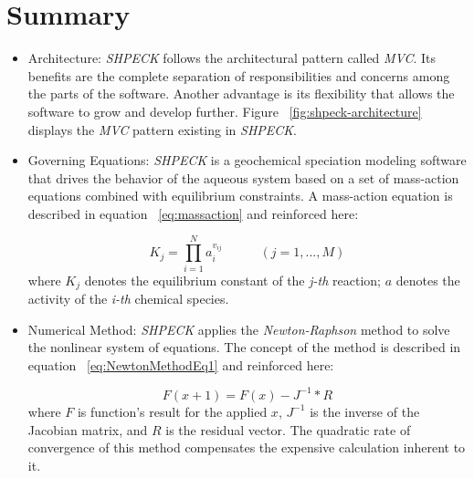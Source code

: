 \section{Summary}
\begin{itemize}
\item Architecture: \emph{SHPECK} follows the architectural pattern called \emph{MVC}. Its benefits are the complete separation of responsibilities and concerns among the parts of the software. Another advantage is its flexibility that allows the software to grow and develop further. Figure ~\ref{fig:shpeck-architecture} displays the \emph{MVC} pattern existing in \emph{SHPECK}.
\item Governing Equations: \emph{SHPECK} is a geochemical speciation modeling software that drives the behavior of the aqueous system based on a set of mass-action equations combined with equilibrium constraints. A mass-action equation is described in equation  ~\ref{eq:massaction} and reinforced here:

\begin{equation}
K_j =  \prod\limits_{i=1}^N  a_i^{v_{ij}} \hspace{35pt}    (j = 1, ... , M)
\end{equation}
where $K_j$ denotes the equilibrium constant of the \emph{j-th} reaction; $a$ denotes the activity of the \emph{i-th} chemical species.

\item Numerical Method: \emph{SHPECK} applies the \emph{Newton-Raphson} method to solve the nonlinear system of equations. The concept of the method is described in equation ~\ref{eq:NewtonMethodEq1} and reinforced here:

\begin{equation}
F(x+1) = F(x) - J^{-1} * R
\end{equation}
where $F$ is function's result for the applied $x$, $J^{-1}$ is the inverse of the Jacobian matrix, and $R$ is the residual vector. The quadratic rate of convergence of this method compensates the expensive calculation inherent to it.


\end{itemize}
